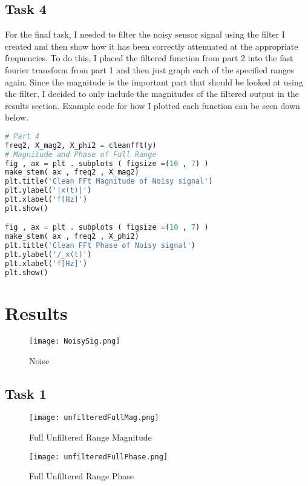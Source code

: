 \documentclass[12pt]{report}
\begin{document}
\subsection{Task 4}
For the final task, I needed to filter the noisy sensor signal using the
filter I created and then show how it has been correctly attenuated at the
appropriate frequencies. To do this, I placed the filtered function from
part 2 into the fast fourier transform from part 1 and then just
graph each of the specified ranges again. Since the magnitude is the
important part that should be looked at using the filter, I decided to
only include the magnitudes of the filtered output in the results section.
Example code for how I plotted each function can be seen down below.
\begin{lstlisting}[language=Python]
# Part 4
freq2, X_mag2, X_phi2 = cleanfft(y)
# Magnitude and Phase of Full Range
fig , ax = plt . subplots ( figsize =(10 , 7) )
make_stem( ax , freq2 , X_mag2)
plt.title('Clean FFt Magnitude of Noisy signal')
plt.ylabel('|x(t)|')
plt.xlabel('f[Hz]')
plt.show()

fig , ax = plt . subplots ( figsize =(10 , 7) )
make_stem( ax , freq2 , X_phi2)
plt.title('Clean FFt Phase of Noisy signal')
plt.ylabel('/_x(t)')
plt.xlabel('f[Hz]')
plt.show()
\end{lstlisting}
\section{Results}
\begin{figure}[H]
\begin{center}
\caption{Noise}
\texttt{[image: NoisySig.png]}
\end{center}
\end{figure}

\subsection{Task 1}
\begin{figure}[H]
\begin{center}
\caption{Full Unfiltered Range Magnitude}
\texttt{[image: unfilteredFullMag.png]}
\end{center}
\end{figure}

\begin{figure}[H]
\begin{center}
\caption{Full Unfiltered Range Phase}
\texttt{[image: unfilteredFullPhase.png]}
\end{center}
\end{figure}
\end{document}
